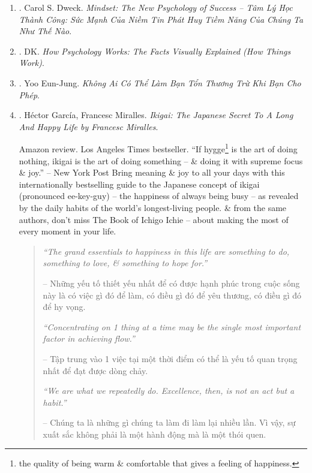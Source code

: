 \documentclass{article}
\begin{document}
\begin{enumerate}
	\item \cite{Dweck_mindset}. Carol S. Dweck. {\it Mindset: The New Psychology of Success -- Tâm Lý Học Thành Công: Sức Mạnh Của Niềm Tin Phát Huy Tiềm Năng Của Chúng Ta Như Thế Nào}.\hfill\hfill{\sf[done]}
	
	\item \cite{DK2018}. DK. {\it How Psychology Works: The Facts Visually Explained (How Things Work)}.\hfill{\sf[reading]}
	
	\item \cite{Eun-Jung_hurt_VN}. Yoo Eun-Jung. {\it Không Ai Có Thể Làm Bạn Tổn Thương Trừ Khi Bạn Cho Phép}.\hfill{\sf[done]}
		
	\item \cite{Garcia_Miralles_ikigai}. {\sc H\'ector Garc\'ia, Francesc Miralles}. {\it Ikigai: The Japanese Secret To A Long And Happy Life by Francesc Miralles}. {}
	
	{\sf Amazon review.} Los Angeles Times bestseller. ``If hygge\footnote{the quality of being warm \& comfortable that gives a feeling of happiness.} is the art of doing nothing, ikigai is the art of doing something -- \& doing it with supreme focus \& joy.'' -- New York Post Bring meaning \& joy to all your days with this internationally bestselling guide to the Japanese concept of ikigai (pronounced ee-key-guy) -- the happiness of always being busy -- as revealed by the daily habits of the world's longest-living people. \& from the same authors, don't miss The Book of Ichigo Ichie -- about making the most of every moment in your life.
	\begin{quotation}
		{\it``The grand essentials to happiness in this life are something to do, something to love, \& something to hope for.''}
		
		-- Những yếu tố thiết yếu nhất để có được hạnh phúc trong cuộc sống này là có việc gì đó để làm, có điều gì đó để yêu thương, có điều gì đó để hy vọng.
		
		{\it``Concentrating on 1 thing at a time may be the single most important factor in achieving flow.''}
		
		-- Tập trung vào 1 việc tại một thời điểm có thể là yếu tố quan trọng nhất để đạt được dòng chảy.
		
		{\it``We are what we repeatedly do. Excellence, then, is not an act but a habit.''}
		
		-- Chúng ta là những gì chúng ta làm đi làm lại nhiều lần. Vì vậy, sự xuất sắc không phải là một hành động mà là một thói quen.
		

\end{quotation}
\end{enumerate}
\end{document}
